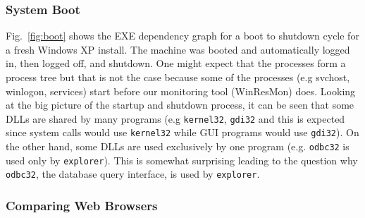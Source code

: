 \subsubsection{System Boot}
\label{sec:apply:boot}

Fig.~\ref{fig:boot} shows the EXE dependency graph for a boot to shutdown cycle
for a fresh Windows XP install. 
The machine was booted and automatically logged in, 
then logged off, and shutdown. One might expect that the processes
form a process tree but that is not the case because some of the processes (e.g
svchost, winlogon, services) start before our monitoring tool
(WinResMon) does. Looking at the big picture of the startup and shutdown
process, it can be seen that some DLLs are shared by many programs (e.g
{\tt kernel32}, {\tt gdi32} and this is expected since system calls would use
{\tt kernel32} while GUI programs would use {\tt gdi32}).
On the other hand, some DLLs are used exclusively by one program (e.g.
{\tt odbc32} is used only by {\tt explorer}).
This is somewhat surprising leading to the question why {\tt odbc32}, 
the database query interface, is used by {\tt explorer}.

\subsubsection{Comparing Web Browsers}


